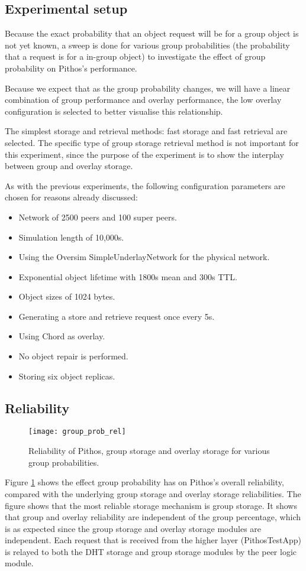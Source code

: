 \subsection{Experimental setup}

Because the exact probability that an object request will be for a group object is not yet known, a sweep is done for various group probabilities (the probability that a request is for a in-group object) to investigate the effect of group probability on Pithos's performance.

Because we expect that as the group probability changes, we will have a linear combination of group performance and overlay performance, the low overlay configuration is selected to better visualise this relationship.

The simplest storage and retrieval methods: fast storage and fast retrieval are selected. The specific type of group storage retrieval method is not important for this experiment, since the purpose of the experiment is to show the interplay between group and overlay storage.

As with the previous experiments, the following configuration parameters are chosen for reasons already discussed:
%
\begin{itemize}
\item Network of 2500 peers and 100 super peers.
\item Simulation length of 10,000s.
\item Using the Oversim SimpleUnderlayNetwork for the physical network.
\item Exponential object lifetime with 1800s mean and 300s TTL.
\item Object sizes of 1024 bytes.
\item Generating a store and retrieve request once every 5s.
\item Using Chord as overlay.
\item No object repair is performed.
\item Storing six object replicas.
\end{itemize}

\subsection{Reliability}

\begin{figure}[htbp]
 \centering
 \texttt{[image: group\_prob\_rel]}
 \caption{Reliability of Pithos, group storage and overlay storage for various group probabilities.}
 \label{fig_group_prob_rel}
\end{figure}
%
Figure \ref{fig_group_prob_rel} shows the effect group probability has on Pithos's overall reliability, compared with the underlying group storage and overlay storage reliabilities. The figure shows that the most reliable storage mechanism is group storage. It shows that group and overlay reliability are independent of the group percentage, which is as expected since the group storage and overlay storage modules are independent. Each request that is received from the higher layer (PithosTestApp) is relayed to both the DHT storage and group storage modules by the peer logic module.

